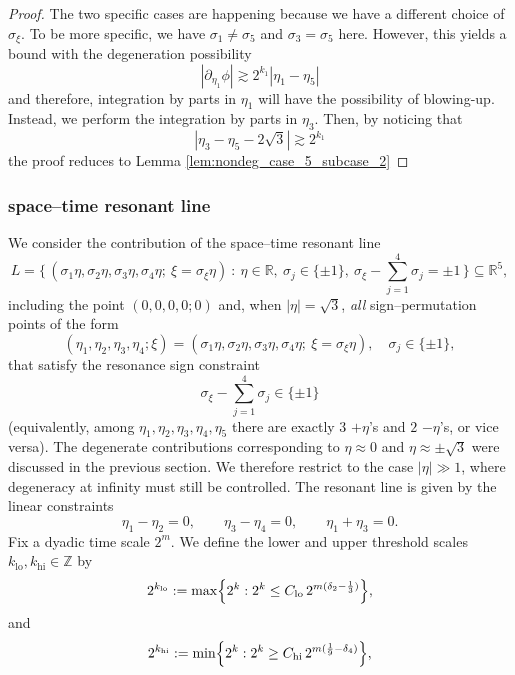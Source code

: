 \documentclass[reqno,english,11pt]{amsart}
\theoremstyle{definition}
\numberwithin{equation}{section}
\begin{document}
\begin{proof}
   The two specific cases are happening because we have a different choice of $\sigma_\xi$.   To be more specific, we have $\sigma_1\neq \sigma_5$ and $\sigma_3=\sigma_5$ here. However, this yields a bound with the degeneration possibility 
    $$|\partial_{\eta_1}\phi|\gtrsim 2^{k_1}|\eta_1-\eta_5|$$
  and therefore, integration by parts in $\eta_1$ will have the possibility of blowing-up. Instead, we perform the integration by parts in $\eta_3$. Then, by noticing that $$|\eta_3-\eta_5-2\sqrt{3}|\gtrsim 2^{k_1}$$
  the proof reduces to Lemma \ref{lem:nondeg_case_5_subcase_2}
\end{proof}
 \subsubsection{space--time resonant line}
We consider the contribution of the space--time resonant line
    \begin{equation*}L
        =\Big\{\,(\sigma_1\eta,\sigma_2\eta,\sigma_3\eta,\sigma_4\eta;\ \xi=\sigma_\xi\eta)\ :\ \eta\in\mathbb R,\ \sigma_j\in\{\pm1\},\ \sigma_\xi-\!\sum_{j=1}^4\sigma_j=\pm1 \,\Big\}\subseteq \mathbb{R}^5,
    \end{equation*}
 including the point $(0,0,0,0;0)$ and, when $|\eta|=\sqrt{3}$, \emph{all} sign–permutation points of the form
$$
(\eta_1,\eta_2,\eta_3,\eta_4;\xi)
= (\sigma_1 \eta,\sigma_2 \eta,\sigma_3 \eta,\sigma_4 \eta;\ \xi=\sigma_\xi \eta),
\quad \sigma_j\in\{\pm1\},
$$
that satisfy the resonance sign constraint
$$
\sigma_\xi-\sum_{j=1}^4 \sigma_j \in \{\pm1\}
$$
(equivalently, among $\eta_1,\eta_2,\eta_3,\eta_4,\eta_5$
there are exactly $3$ $+\eta$’s and $2$ $-\eta$’s, or vice versa). The degenerate contributions corresponding to $\eta\approx0$ and $\eta\approx\pm\sqrt{3}$ were discussed in the previous section.
We therefore restrict to the case $|\eta|\gg1$, where
degeneracy at infinity must still be controlled. The resonant line is given by the linear constraints
$$\eta_1-\eta_2=0,\qquad \eta_3-\eta_4=0,\qquad \eta_1+\eta_3=0.$$
Fix a dyadic time scale $2^m$. We define the lower and upper threshold scales
$k_{\operatorname{lo}},k_{\operatorname{hi}}\in\mathbb Z$ by
\begin{equation}\label{eq:def_k_lo}
2^{k_{\operatorname{lo}}}:= \max\Bigl\{2^k : 2^k \le C_{\operatorname{lo}}\,2^{m(\delta_2-\frac13)}\Bigr\},
\end{equation}
and
\begin{equation}\label{eq:def_k_hi}
2^{k_{\operatorname{hi}}}
:= \min\Bigl\{2^k : 2^k \ge C_{\operatorname{hi}}\,2^{m(\frac19-\delta_4)}\Bigr\},
\end{equation}
\end{document}

